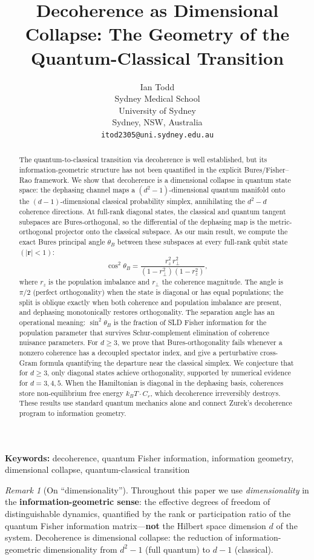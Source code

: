 \documentclass[12pt,a4paper]{article}
\title{Decoherence as Dimensional Collapse: The Geometry of the Quantum-Classical Transition}
\author{Ian Todd\\
Sydney Medical School\\
University of Sydney\\
Sydney, NSW, Australia\\
\texttt{itod2305@uni.sydney.edu.au}}
\date{}
\theoremstyle{definition}
\theoremstyle{remark}
\newtheorem{remark}[theorem]{Remark}
\begin{document}
\maketitle

\begin{abstract}
The quantum-to-classical transition via decoherence is well established, but its information-geometric structure has not been quantified in the explicit Bures/Fisher--Rao framework. We show that decoherence is a dimensional collapse in quantum state space: the dephasing channel maps a $(d^2-1)$-dimensional quantum manifold onto the $(d-1)$-dimensional classical probability simplex, annihilating the $d^2-d$ coherence directions. At full-rank diagonal states, the classical and quantum tangent subspaces are Bures-orthogonal, so the differential of the dephasing map is the metric-orthogonal projector onto the classical subspace. As our main result, we compute the exact Bures principal angle $\theta_B$ between these subspaces at every full-rank qubit state $(|\mathbf{r}| < 1)$:
\[
\cos^2\theta_B = \frac{r_z^2\, r_\perp^2}{(1-r_\perp^2)(1-r_z^2)},
\]
where $r_z$ is the population imbalance and $r_\perp$ the coherence magnitude. The angle is $\pi/2$ (perfect orthogonality) when the state is diagonal or has equal populations; the split is oblique exactly when both coherence and population imbalance are present, and dephasing monotonically restores orthogonality. The separation angle has an operational meaning: $\sin^2\theta_B$ is the fraction of SLD Fisher information for the population parameter that survives Schur-complement elimination of coherence nuisance parameters. For $d \geq 3$, we prove that Bures-orthogonality fails whenever a nonzero coherence has a decoupled spectator index, and give a perturbative cross-Gram formula quantifying the departure near the classical simplex.  We conjecture that for $d \geq 3$, only diagonal states achieve orthogonality, supported by numerical evidence for $d = 3, 4, 5$. When the Hamiltonian is diagonal in the dephasing basis, coherences store non-equilibrium free energy $k_BT \cdot C_r$, which decoherence irreversibly destroys. These results use standard quantum mechanics alone and connect Zurek's decoherence program to information geometry.
\end{abstract}

\noindent\textbf{Keywords:} decoherence, quantum Fisher information, information geometry, dimensional collapse, quantum-classical transition

\begin{remark}[On ``dimensionality'']
\label{rem:dimensionality}
Throughout this paper we use \emph{dimensionality} in the \textbf{information-geometric sense}: the effective degrees of freedom of distinguishable dynamics, quantified by the rank or participation ratio of the quantum Fisher information matrix---\textbf{not} the Hilbert space dimension $d$ of the system. Decoherence is dimensional collapse: the reduction of information-geometric dimensionality from $d^2 - 1$ (full quantum) to $d - 1$ (classical).
\end{remark}
\end{document}
